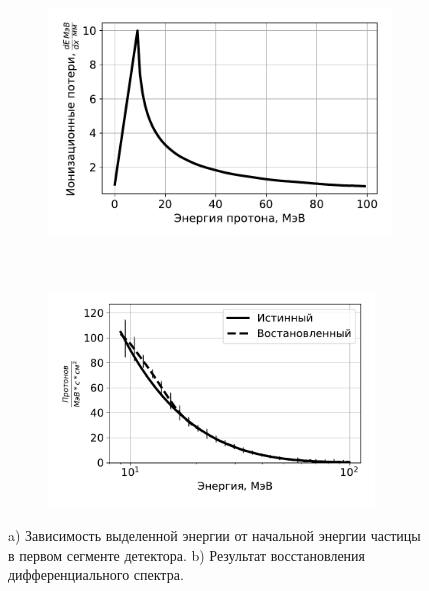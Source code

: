 \documentclass[12pt, a4paper, notitlepage, onecolumn]{article}
\begin{document}
\begin{figure}[ht!]
	\begin{subfigure}[b]{0.5\textwidth}
    	\includegraphics[width=0.95\linewidth]{pictures/05_LossInCell.pdf}
        \caption{}
        \label{pic-03-a}
    \end{subfigure}
	~
    \begin{subfigure}[b]{0.5\textwidth}
		\includegraphics[width=0.95\textwidth]{pictures/06_IntegralSpectrum.pdf}
% 
% 
        \caption{}
        \label{pic-03-b}
    \end{subfigure}
    \caption{ a) Зависимость выделенной энергии от начальной энергии частицы в первом сегменте детектора. b) Результат восстановления дифференциального спектра.}
\end{figure}

\end{document}
